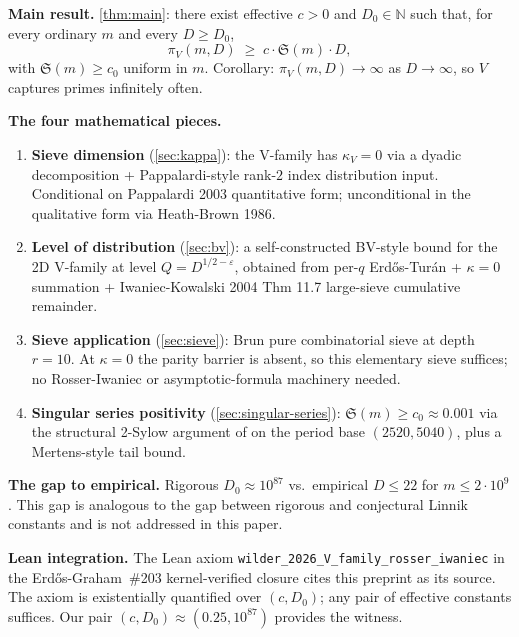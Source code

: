 \documentclass[11pt,a4paper]{article}
\theoremstyle{plain}
\theoremstyle{definition}
\theoremstyle{remark}
\begin{document}
\textbf{Main result.} \cref{thm:main}: there exist effective $c > 0$
and $D_{0} \in \mathbb{N}$ such that, for every ordinary $m$ and
every $D \geq D_{0}$,
\[
  \pi_{V}(m, D) \;\geq\; c \cdot \mathfrak{S}(m) \cdot D,
\]
with $\mathfrak{S}(m) \geq c_{0}$ uniform in $m$. Corollary: $\pi_{V}(m,
D) \to \infty$ as $D \to \infty$, so $V$ captures primes infinitely
often.

\textbf{The four mathematical pieces.}
\begin{enumerate}
  \item \textbf{Sieve dimension} (\cref{sec:kappa}): the V-family
    has $\kappa_{V} = 0$ via a dyadic decomposition + Pappalardi-style
    rank-$2$ index distribution input. Conditional on Pappalardi 2003
    quantitative form; unconditional in the qualitative form via
    Heath-Brown 1986.

  \item \textbf{Level of distribution} (\cref{sec:bv}): a
    self-constructed BV-style bound for the 2D V-family at level
    $Q = D^{1/2 - \varepsilon}$, obtained from per-$q$ Erd\H{o}s-Tur\'an
    + $\kappa = 0$ summation + Iwaniec-Kowalski 2004 Thm 11.7
    large-sieve cumulative remainder.

  \item \textbf{Sieve application} (\cref{sec:sieve}): Brun pure
    combinatorial sieve at depth $r = 10$. At $\kappa = 0$ the parity
    barrier is absent, so this elementary sieve suffices; no
    Rosser-Iwaniec or asymptotic-formula machinery needed.

  \item \textbf{Singular series positivity}
    (\cref{sec:singular-series}): $\mathfrak{S}(m) \geq c_{0} \approx
    0.001$ via the structural 2-Sylow argument of
    \cite{WilderChain103} on the period base $(2520, 5040)$, plus a
    Mertens-style tail bound.
\end{enumerate}

\textbf{The gap to empirical.} Rigorous $D_{0} \approx 10^{87}$ vs.\
empirical $D \leq 22$ for $m \leq 2 \cdot 10^{9}$. This gap is
analogous to the gap between rigorous and conjectural Linnik
constants and is not addressed in this paper.

\textbf{Lean integration.} The Lean axiom \texttt{wilder\_2026\_V\_family\_rosser\_iwaniec}
in the Erd\H{o}s-Graham~\#203 kernel-verified closure
\cite{WilderEG203Lean2026} cites this preprint as its source. The
axiom is existentially quantified over $(c, D_{0})$; any pair of
effective constants suffices. Our pair $(c, D_{0}) \approx
(0.25, 10^{87})$ provides the witness.
\end{document}
